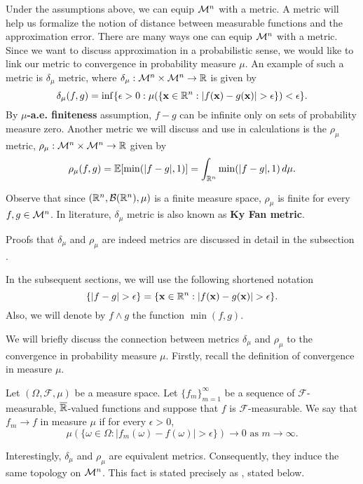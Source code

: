 Under the assumptions above, we can equip ${\mathcal M}^n$ with a metric. A metric will help us formalize the notion of distance between measurable functions and the approximation error. There are many ways one can equip ${\mathcal M}^n$ with a metric. Since we want to discuss approximation in a probabilistic sense, we would like to link our metric to convergence in probability measure $\mu$. An example of such a metric is $\delta_\mu$ metric, where $\delta_\mu : {\mathcal M}^n \times {\mathcal M}^n \to {\mathbb R}$ is given by \[
    \delta_\mu (f, g) = \inf \{ \epsilon > 0 : \mu (\{ \mathbf{x} \in {\mathbb R}^n : | f (\mathbf{x}) - g (\mathbf{x}) | > \epsilon \}) < \epsilon \}.
\]
By \textbf{$\mu$-a.e. finiteness} assumption, $f - g$ can be infinite only on sets of probability measure zero. Another metric we will discuss and use in calculations is the $\rho_\mu$ metric, $\rho_\mu : {\mathcal M}^n \times {\mathcal M}^n \to {\mathbb R}$ given by \[
    \rho_\mu (f, g) = \mathbb{E} [\min(| f - g |, 1)] = \int_{{\mathbb R}^n} \min(| f - g |, 1) \, d\mu.
\]
\begin{remark}
Observe that since $({\mathbb R}^n, {\mathcal B}({\mathbb R}^n), \mu)$ is a finite measure space, $\rho_\mu$ is finite for every $f, g \in {\mathcal M}^n$. 
In literature, $\delta_\mu$ metric is also known as \textbf{Ky Fan metric}.
\end{remark}
\begin{remark}
Proofs that $\delta_\mu$ and $\rho_\mu$ are indeed metrics are discussed in detail in the subsection .
\end{remark}
\begin{remark}
In the subsequent sections, we will use the following shortened notation  \[
    \{ | f - g| > \epsilon \} = \{ \mathbf{x} \in {\mathbb R}^n : | f(\mathbf{x}) - g(\mathbf{x}) | > \epsilon \}.
\]
Also, we will denote by $f \wedge g$ the function $\min(f,g)$.
\end{remark}
We will briefly discuss the connection between metrics $\delta_\mu$ and $\rho_\mu$ to the convergence in probability measure $\mu$. Firstly, recall the definition of convergence in measure $\mu$. 

\begin{definition}
Let $(\Omega, \mathcal{F}, \mu)$ be a measure space. Let $\{ f_m \}_{m=1}^\infty$ be a sequence of $\mathcal{F}$-measurable, $\overline{{\mathbb R}}$-valued functions and suppose that $f$ is $\mathcal{F}$-measurable. We say that $f_m \to f$ in measure $\mu$ if for every $\epsilon > 0$, \[ 
    \mu(\{ \omega \in \Omega : | f_m (\omega) - f(\omega) | > \epsilon \}) \to 0 \text{ as $m \to \infty.$}
\]
\end{definition}
Interestingly, $\delta_\mu$ and $\rho_\mu$ are equivalent metrics. Consequently, they induce the same topology on ${\mathcal M}^n$. This fact is stated precisely as , stated below.


